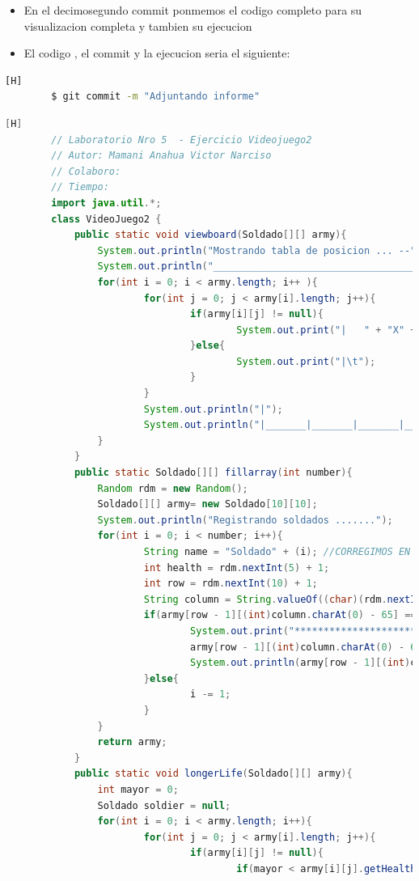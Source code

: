 \documentclass{article}
\begin{document}
	\begin{itemize}	
		\item En el decimosegundo commit ponmemos el codigo completo para su visualizacion completa y tambien su ejecucion
		\item El codigo , el commit y la ejecucion seria el siguiente:
	\end{itemize}	
	\begin{lstlisting}[language=bash,caption={Commit}][H]
		$ git commit -m "Adjuntando informe"
	\end{lstlisting}	
	\begin{lstlisting}[language=java,caption={Las lineas de codigos del metodo creado:}][H]
		// Laboratorio Nro 5  - Ejercicio Videojuego2
		// Autor: Mamani Anahua Victor Narciso
		// Colaboro:
		// Tiempo:
		import java.util.*;
		class VideoJuego2 {
			public static void viewboard(Soldado[][] army){
				System.out.println("Mostrando tabla de posicion ... --");
				System.out.println("_________________________________________________________________________________");
				for(int i = 0; i < army.length; i++ ){
						for(int j = 0; j < army[i].length; j++){
								if(army[i][j] != null){
										System.out.print("|   " + "X" + "   ");//ARREGLANDO PARA QUE SE PUEDA IMPRIMIR DE BUENA FORMA
								}else{
										System.out.print("|\t");
								}
						}
						System.out.println("|");
						System.out.println("|_______|_______|_______|_______|_______|_______|_______|_______|_______|_______|");
				}
			}
			public static Soldado[][] fillarray(int number){
				Random rdm = new Random();
				Soldado[][] army= new Soldado[10][10];
				System.out.println("Registrando soldados .......");
				for(int i = 0; i < number; i++){
						String name = "Soldado" + (i); //CORREGIMOS EN EL NOMBRE YA QUE ESTE COMNEZABA DESDE EL 0
						int health = rdm.nextInt(5) + 1;
						int row = rdm.nextInt(10) + 1;
						String column = String.valueOf((char)(rdm.nextInt(10) + 65));  
						if(army[row - 1][(int)column.charAt(0) - 65] == null){
								System.out.print("*********************************");
								army[row - 1][(int)column.charAt(0) - 65] = new Soldado(name, health, row, column);
								System.out.println(army[row - 1][(int)column.charAt(0) - 65].toString());
						}else{
								i -= 1;
						}
				}
				return army;
			}
			public static void longerLife(Soldado[][] army){
				int mayor = 0;
				Soldado soldier = null;
				for(int i = 0; i < army.length; i++){
						for(int j = 0; j < army[i].length; j++){
								if(army[i][j] != null){
										if(mayor < army[i][j].getHealth()){

\end{lstlisting}
\end{document}
